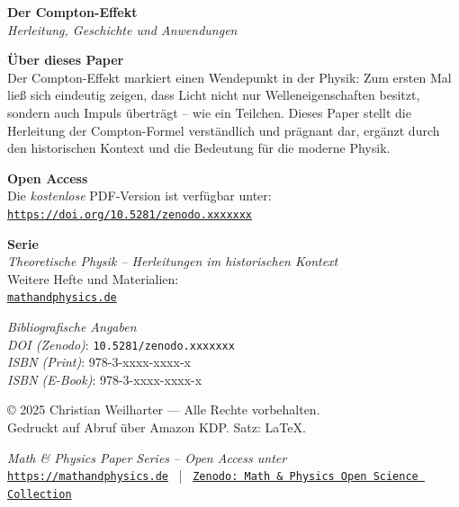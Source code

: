 \documentclass[12pt,oneside]{scrartcl}
\newcommand{\PaperDOI}{\emph{DOI (Zenodo)}: \texttt{10.5281/zenodo.xxxxxxx}}
\newcommand{\PaperISBNPDF}{\emph{ISBN (Print)}: 978-3-xxxx-xxxx-x}
\newcommand{\PaperISBNEPUB}{\emph{ISBN (E-Book)}: 978-3-xxxx-xxxx-x}
\begin{document}
	\printbibliography
	\clearpage
	\thispagestyle{empty}
	
	\vspace*{1.5cm}
	
	{\Large\bfseries Der Compton-Effekt}\\[0.5em]
	{\large\itshape Herleitung, Geschichte und Anwendungen}
	
	\vspace{1.2cm}
	
	\noindent
	\textbf{Über dieses Paper}\\
	Der Compton-Effekt markiert einen Wendepunkt in der Physik:
	Zum ersten Mal ließ sich eindeutig zeigen, dass Licht nicht
	nur Welleneigenschaften besitzt, sondern auch Impuls überträgt –
	wie ein Teilchen. Dieses Paper stellt die Herleitung der
	Compton-Formel verständlich und prägnant dar, ergänzt durch den
	historischen Kontext und die Bedeutung für die moderne Physik.
	
	\vspace{1.0cm}
	
	\noindent
	\textbf{Open Access}\\
	Die \emph{kostenlose} PDF-Version ist verfügbar unter:\\[2pt]
	\href{https://doi.org/10.5281/zenodo.xxxxxxx}{\texttt{https://doi.org/10.5281/zenodo.xxxxxxx}}
	
	\vspace{0.8cm}
	
	\noindent
	\textbf{Serie}\\
	\textit{Theoretische Physik – Herleitungen im historischen Kontext}\\
	Weitere Hefte und Materialien:\\
	\href{https://mathandphysics.de}{\texttt{mathandphysics.de}}
	
	\vfill
	
	\noindent
	\small
	\textit{Bibliografische Angaben}\\
	\PaperDOI\\
	\PaperISBNPDF\\
	\PaperISBNEPUB
	
	\vspace{0.8cm}
	
	\noindent
	\footnotesize
	© 2025 Christian Weilharter — Alle Rechte vorbehalten.\\
	Gedruckt auf Abruf über Amazon KDP. Satz: \LaTeX.
	
	\vfill
	\begin{center}
		\small
		\textit{Math \& Physics Paper Series – Open Access unter}\\[2pt]
		\href{https://mathandphysics.de}{\texttt{https://mathandphysics.de}} \, | \,
		\href{https://zenodo.org/communities/mathandphysics}{\texttt{Zenodo: Math \& Physics Open Science Collection}}
	\end{center}
	
\end{document}
